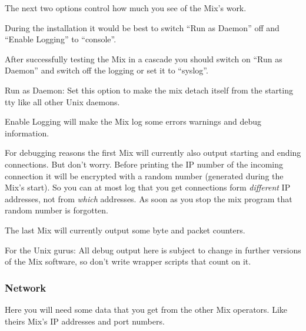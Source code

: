 \documentclass{article}
\begin{document}
The next two options control how much you see of the Mix's work.

During the installation it would be best to switch ``Run as Daemon''
off and ``Enable Logging'' to ``console''.

After successfully testing the Mix in a cascade you should switch on
``Run as Daemon'' and switch off the logging or set it to ``syslog''.

\begin{description}

\item{Run as Daemon}: Set this option to make the mix detach itself from the 
  starting tty like all other Unix daemons.
  
\item{Enable Logging} will make the Mix log some errors warnings and
  debug information. 
  
  For debugging reasons the first Mix will currently also output
  starting and ending connections.  But don't worry.  Before printing
  the IP number of the incoming connection it will be encrypted
  with a random number (generated during the Mix's start). So you can
  at most log that you get connections form \emph{different} IP
  addresses, not from \emph{which} addresses. As soon as you stop the
  mix program that random number is forgotten.

  The last Mix will currently output some byte and packet counters.
  
  For the Unix gurus: All debug output here is subject to change in
  further versions of the Mix software, so don't write wrapper scripts
  that count on it.

\end{description}


\subsubsection{Network}

Here you will need some data that you get from the other Mix operators.
Like theirs Mix's IP addresses and port numbers.
\end{document}
